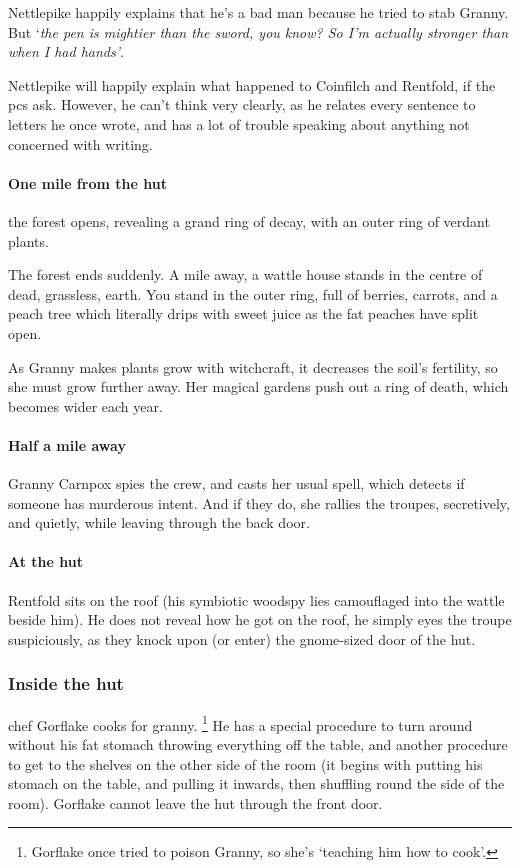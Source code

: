 \documentclass[10pt,twoside]{book}
\begin{document}
Nettlepike happily explains that he's a bad man because he tried to stab Granny.
But `\textit{the pen is mightier than the sword, you know?
So I'm actually stronger than when I had hands'}.

Nettlepike will happily explain what happened to Coinfilch and Rentfold, if the \glspl{pc} ask.
However, he can't think very clearly, as he relates every sentence to letters he once wrote, and has a lot of trouble speaking about anything not concerned with writing.

\paragraph{One mile from the hut}
the forest opens, revealing a grand ring of decay, with an outer ring of verdant plants.

\begin{boxtext}
  The forest ends suddenly.
  A mile away, a wattle house stands in the centre of dead, grassless, earth.
  You stand in the outer ring, full of berries, carrots, and a peach tree which literally drips with sweet juice as the fat peaches have split open.
\end{boxtext}

\begin{exampletext}
  As Granny makes plants grow with witchcraft, it decreases the soil's fertility, so she must grow further away.
  Her magical gardens push out a ring of death, which becomes wider each year.
\end{exampletext}

\paragraph{Half a mile away}
Granny Carnpox spies the crew, and casts her usual \gls{spell}, which detects if someone has murderous intent.
And if they do, she rallies the troupes, secretively, and quietly, while leaving through the back door.

\paragraph{At the hut}
Rentfold sits on the roof (his symbiotic \gls{woodspy} lies camouflaged into the wattle beside him).
He does not reveal how he got on the roof, he simply eyes the troupe suspiciously, as they knock upon (or enter) the gnome-sized door of the hut.

\subsubsection{Inside the hut}
chef Gorflake cooks for granny.%
\footnote{Gorflake once tried to poison Granny, so she's `teaching him how to cook'.}
He has a special procedure to turn around without his fat stomach throwing everything off the table, and another procedure to get to the shelves on the other side of the room (it begins with putting his stomach on the table, and pulling it inwards, then shuffling round the side of the room).
Gorflake cannot leave the hut through the front door.
\end{document}
